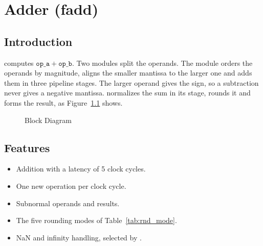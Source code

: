 \chapter{Adder (fadd)}
\label{ch:fadd}

\section{Introduction}

 computes $\mathtt{op\_a}+\mathtt{op\_b}$. Two  modules
split the operands. The  module orders the operands by magnitude, aligns
the smaller mantissa to the larger one and adds them in three pipeline stages. The
larger operand gives the sign, so a subtraction never gives a negative mantissa.  normalizes the sum in its  stage, rounds it
and forms the result, as Figure~\ref{fig:fadd} shows.

\begin{figure}[H]
\centering
{}
\caption{ Block Diagram}
\label{fig:fadd}
\end{figure}

\section{Features}

\begin{itemize}
\item Addition with a latency of 5 clock cycles.
\item One new operation per clock cycle.
\item Subnormal operands and results.
\item The five rounding modes of Table~\ref{tab:rnd_mode}.
\item NaN and infinity handling, selected by .
\end{itemize}

